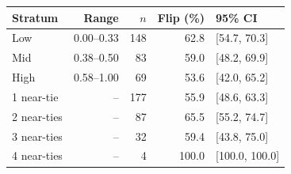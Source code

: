 
\footnotesize
\begin{tabular*}{\textwidth}{@{\extracolsep{\fill}}lrrrl}
\toprule
Stratum & Range & $n$ & Flip (\%) & 95\% CI\\
\midrule
Low & 0.00--0.33 & 148 & 62.8 & [54.7, 70.3]\\
Mid & 0.38--0.50 & 83 & 59.0 & [48.2, 69.9]\\
High & 0.58--1.00 & 69 & 53.6 & [42.0, 65.2]\\
1 near-tie & -- & 177 & 55.9 & [48.6, 63.3]\\
2 near-ties & -- & 87 & 65.5 & [55.2, 74.7]\\
3 near-ties & -- & 32 & 59.4 & [43.8, 75.0]\\
4 near-ties & -- & 4 & 100.0 & [100.0, 100.0]\\
\bottomrule
\end{tabular*}
